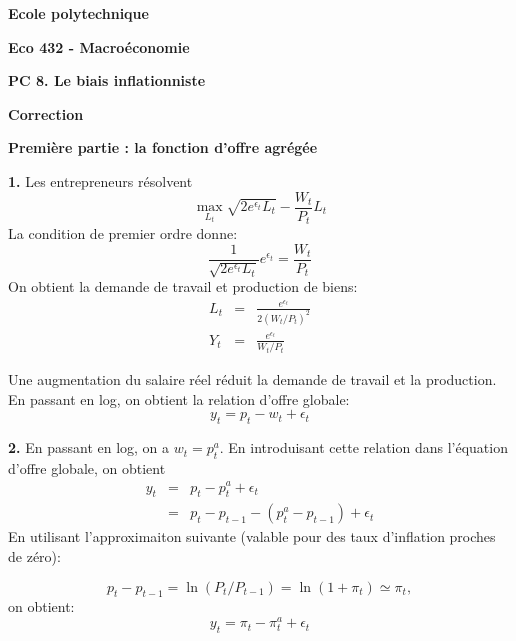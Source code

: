 \documentclass[11pt,a4paper]{article}
\begin{document}
\begin{center}
\textbf{Ecole polytechnique}

\bigskip

\textbf{Eco 432 - Macro\'{e}conomie}

\bigskip

\textbf{PC 8. Le biais inflationniste}

\bigskip

\textbf{Correction}

\hspace{1.0in}
\end{center}

\bigskip

\noindent \textbf{Premi\`{e}re partie : la fonction d'offre agr\'{e}g\'{e}e}

\noindent \textbf{1.} Les entrepreneurs r\'{e}solvent%
\begin{equation*}
\max_{L_{t}}\sqrt{2e^{\epsilon _{t}}L_{t}}-\frac{W_{t}}{P_{t}}L_{t}
\end{equation*}%
La condition de premier ordre donne:%
\begin{equation*}
\frac{1}{\sqrt{2e^{\epsilon _{t}}L_{t}}}e^{\epsilon _{t}}=\frac{W_{t}}{P_{t}}
\end{equation*}%
On obtient la demande de travail et production de biens:%
\begin{eqnarray*}
L_{t} &=&\frac{e^{\epsilon _{t}}}{2\left( W_{t}/P_{t}\right) ^{2}} \\
Y_{t} &=&\frac{e^{\epsilon _{t}}}{W_{t}/P_{t}}
\end{eqnarray*}

Une augmentation du salaire r\'{e}el r\'{e}duit la demande de travail et la
production. En passant en log, on obtient la relation d'offre globale:%
\begin{equation*}
y_{t}=p_{t}-w_{t}+\epsilon _{t}
\end{equation*}

\bigskip

\noindent \textbf{2.} En passant en log, on a $w_{t}=p_{t}^{a}$. En
introduisant cette relation dans l'\'{e}quation d'offre globale, on obtient%
\begin{eqnarray*}
y_{t} &=&p_{t}-p_{t}^{a}+\epsilon _{t} \\
&=&p_{t}-p_{t-1}-\left( p_{t}^{a}-p_{t-1}\right) +\epsilon _{t}
\end{eqnarray*}%
En utilisant l'approximaiton suivante (valable pour des taux d'inflation
proches de z\'{e}ro):

\begin{equation*}
p_{t}-p_{t-1}=\ln \left( P_{t}/P_{t-1}\right) =\ln \left( 1+\pi _{t}\right)
\simeq \pi _{t},
\end{equation*}%
on obtient:%
\begin{equation*}
y_{t}=\pi _{t}-\pi _{t}^{a}+\epsilon _{t}
\end{equation*}
\end{document}
